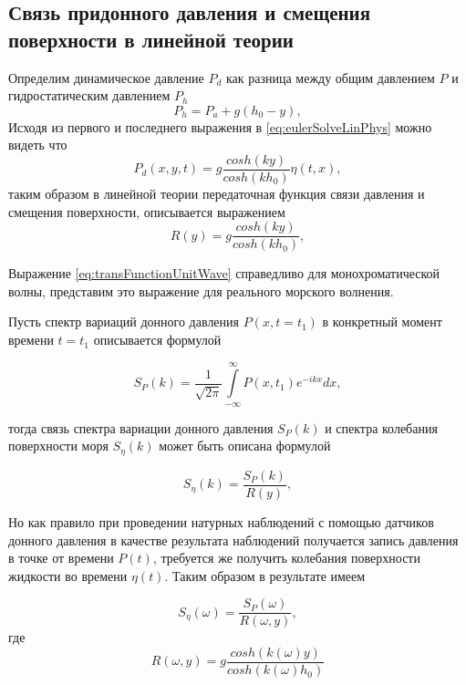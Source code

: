 \subsection{Связь придонного давления и смещения поверхности в линейной теории}
Определим динамическое давление $P_d$ как разница между общим давлением $P$ и гидростатическим давлением $P_h$
$$
P_h=P_a+g(h_0-y),
$$
Исходя из первого и последнего выражения в \eqref{eq:eulerSolveLinPhys} можно видеть что
\begin{equation}\label{eq:dynPressure}
  P_d(x,y,t)=g\frac{cosh(ky)}{cosh(kh_0)}\eta(t,x),
\end{equation}
таким образом в линейной теории передаточная функция связи давления и смещения поверхности, описывается выражением
\begin{equation}\label{eq:transFunctionUnitWave}
  R(y)=g\frac{cosh(ky)}{cosh(kh_0)},
\end{equation}

Выражение \eqref{eq:transFunctionUnitWave} справедливо для монохроматической волны, представим это выражение для реального морского волнения.

Пусть спектр вариаций донного давления $P(x,t=t_1)$ в конкретный момент времени $t=t_1$ описывается формулой

\begin{equation}\label{eq:spectrPressure}
    S_P(k)=\frac{1}{\sqrt{2\pi}}\int\limits_{-\infty}^{\infty}P(x,t_1)e^{-ikx}dx,
\end{equation}

тогда связь спектра вариации донного давления $S_P(k)$ и спектра колебания поверхности моря $S_{\eta}(k)$ может быть описана формулой

\begin{equation}\label{eq:relationSpectrs_K}
    S_{\eta}(k)=\frac{S_P(k)}{R(y)},
\end{equation}

Но как правило при проведении натурных наблюдений с помощью датчиков донного давления в качестве результата наблюдений получается запись давления в точке от времени $P(t)$, требуется же получить колебания поверхности жидкости во времени $\eta(t)$. Таким образом в результате имеем

\begin{equation}\label{eq:relationSpectrs}
    S_{\eta}(\omega)=\frac{S_P(\omega)}{R(\omega,y)},
\end{equation}
где
\begin{equation}\label{eq:coeffAtten_W}
    R(\omega,y)=g\frac{cosh(k(\omega)y)}{cosh(k(\omega)h_0)}
\end{equation}


